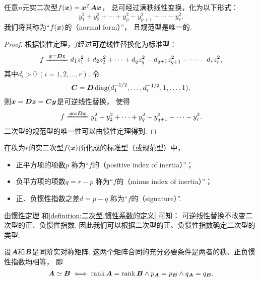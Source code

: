 \begin{corollary}
任意\(n\)元实二次型\(f(\boldsymbol{x}) = \boldsymbol{x}^T\boldsymbol{A}\boldsymbol{x}\)，
总可经过满秩线性变换，化为以下形式：\[
	y_1^2+y_2^2+ \dotsb +y_p^2
	-y_{p+1}^2-\dotsb-y_r^2.
\]
我们将其称为“\(f(\boldsymbol{x})\)的（{\rm normal form}）”，
且规范型是唯一的.
\begin{proof}
根据惯性定理，\(f\)经过可逆线性替换化为标准型：\[
	f \xlongequal{\vb{x}=\vb{D}\vb{z}}
	d_1 z_1^2 + d_2 z_2^2 + \dotsb + d_q z_q^2 - d_{q+1} z_{q+1}^2 - \dotsb - d_r z_r^2,
\]
其中\(d_i>0\ (i=1,2,\dotsc,r)\).
令\[
	\boldsymbol{C} = \boldsymbol{D} \operatorname{diag}(d_1^{-1/2},\dotsc,d_r^{-1/2},1,\dotsc,1),
\]
则\(\boldsymbol{x} = \boldsymbol{D}\boldsymbol{z} = \boldsymbol{C}\boldsymbol{y}\)是可逆线性替换，
使得\[
	f \xlongequal{\vb{x}=\vb{D}\vb{z}} y_1^2 + y_2^2 + \dotsb + y_q^2 - y_{q+1}^2 - \dotsb - y_r^2.
\]
二次型的规范型的唯一性可以由惯性定理得到.
\end{proof}
\end{corollary}

\begin{definition}\label{definition:二次型.惯性系数的定义}
在秩为\(r\)的实二次型\(f(\boldsymbol{x})\)所化成的标准型（或规范型）中，
\begin{itemize}
	\item 正平方项的项数\(p\)
	称为“\(f\)的（positive index of inertia）”；
	\item 负平方项的项数\(q=r-p\)
	称为“\(f\)的（minus index of inertia）”；
	\item 正、负惯性指数之差\(d=p-q\)
	称为“\(f\)的（signature）”.
\end{itemize}
\end{definition}
由\hyperref[theorem:二次型.惯性定理]{惯性定理}%
和\cref{definition:二次型.惯性系数的定义} 可知：
可逆线性替换不改变二次型的正、负惯性指数.
因此我们可以根据二次型的正、负惯性指数确定二次型的类型.

\begin{theorem}
设\(\boldsymbol{A}\)和\(\boldsymbol{B}\)是同阶实对称矩阵.
这两个矩阵合同的充分必要条件是两者的秩、正负惯性指数均相等，
即\[
	\boldsymbol{A}\simeq\boldsymbol{B}
	\iff
	\rank\boldsymbol{A}=\rank\boldsymbol{B} \land p_{\boldsymbol{A}}=p_{\boldsymbol{B}} \land q_{\boldsymbol{A}}=q_{\boldsymbol{B}}.
\]
\end{theorem}

